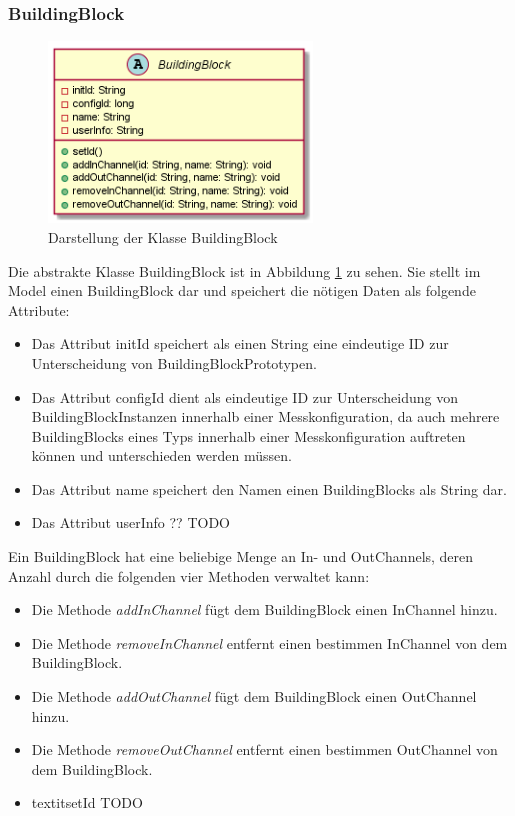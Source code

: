 \documentclass[parskip=full]{scrartcl}
\begin{document}
\subsubsection{BuildingBlock}
\begin{figure}[htbp]
	\begin{center}
		\includegraphics[width = 7cm]{Grafiken/BuildingBlock.png}
		\caption{Darstellung der Klasse BuildingBlock}
		\label{BuildingBlock}
	\end{center}
\end{figure}

Die abstrakte Klasse BuildingBlock ist in Abbildung \ref{BuildingBlock} zu sehen. Sie stellt im Model einen BuildingBlock dar und speichert die nötigen Daten als folgende Attribute:
\begin{itemize}

\item Das Attribut initId speichert als einen String eine eindeutige ID zur Unterscheidung von BuildingBlockPrototypen.
\item Das Attribut configId dient als eindeutige ID zur Unterscheidung von BuildingBlockInstanzen innerhalb einer Messkonfiguration, da auch mehrere BuildingBlocks eines Typs innerhalb einer Messkonfiguration auftreten können und unterschieden werden müssen.
\item Das Attribut name speichert den Namen einen BuildingBlocks als String dar. 
\item Das Attribut userInfo ?? TODO
\end{itemize}
Ein BuildingBlock hat eine beliebige Menge an In- und OutChannels, deren Anzahl durch die folgenden vier Methoden verwaltet kann:

\begin{itemize}

\item Die Methode \textit{addInChannel} fügt dem BuildingBlock einen InChannel hinzu.
\item Die Methode \textit{removeInChannel} entfernt einen bestimmen InChannel von dem BuildingBlock.
\item Die Methode \textit{addOutChannel} fügt dem BuildingBlock einen OutChannel hinzu.
\item Die Methode \textit{removeOutChannel} entfernt einen bestimmen OutChannel von dem BuildingBlock.
\item textit{setId} TODO
\end{itemize}
\end{document}
